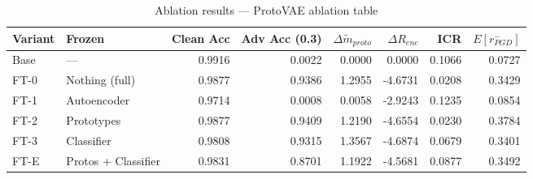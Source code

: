 \begin{table}
\caption{Ablation results — ProtoVAE ablation table}
\label{tab:ProtoVAE_ablation_table}
\begin{tabular}{llrrrrrr}
\toprule
Variant & Frozen & Clean Acc & Adv Acc (0.3) & $\Delta\tilde{m}_{proto}$ & $\Delta R_{enc}$ & ICR & $E[r_{PGD}^-]$ \\
\midrule
Base & — & 0.9916 & 0.0022 & 0.0000 & 0.0000 & 0.1066 & 0.0727 \\
FT-0 & Nothing (full) & 0.9877 & 0.9386 & 1.2955 & -4.6731 & 0.0208 & 0.3429 \\
FT-1 & Autoencoder & 0.9714 & 0.0008 & 0.0058 & -2.9243 & 0.1235 & 0.0854 \\
FT-2 & Prototypes & 0.9877 & 0.9409 & 1.2190 & -4.6554 & 0.0230 & 0.3784 \\
FT-3 & Classifier & 0.9808 & 0.9315 & 1.3567 & -4.6874 & 0.0679 & 0.3401 \\
FT-E & Protos + Classifier & 0.9831 & 0.8701 & 1.1922 & -4.5681 & 0.0877 & 0.3492 \\
\bottomrule
\end{tabular}
\end{table}
